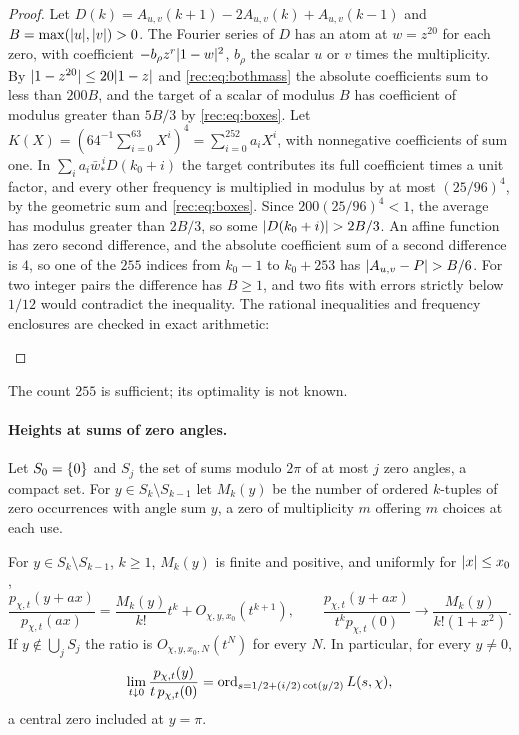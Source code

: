 \begin{proof}
Let $D(k)=A_{u,v}(k+1)-2A_{u,v}(k)+A_{u,v}(k-1)$ and $B=\max(\lvert u\rvert,\lvert v\rvert)>0$. The Fourier series of $D$ has an atom at
$w=z^{20}$ for each zero, with coefficient $-b_\rho z^r\lvert1-w\rvert^2$, $b_\rho$ the scalar $u$ or $v$ times the multiplicity. By
$\lvert1-z^{20}\rvert\le20\lvert1-z\rvert$ and \eqref{rec:eq:bothmass} the absolute coefficients sum to less than $200B$, and the target
of a scalar of modulus $B$ has coefficient of modulus greater than $5B/3$ by \eqref{rec:eq:boxes}. Let
$K(X)=(64^{-1}\sum_{i=0}^{63}X^i)^4=\sum_{i=0}^{252}a_iX^i$, with nonnegative coefficients of sum one. In
$\sum_ia_i\bar w_*^{\,i}D(k_0+i)$ the target contributes its full coefficient times a unit factor, and every other frequency is
multiplied in modulus by at most $(25/96)^4$, by the geometric sum and \eqref{rec:eq:boxes}. Since $200(25/96)^4<1$, the
average has modulus greater than $2B/3$, so some $\lvert D(k_0+i)\rvert>2B/3$. An affine function has zero second difference,
and the absolute coefficient sum of a second difference is $4$, so one of the $255$ indices from $k_0-1$ to $k_0+253$ has
$\lvert A_{u,v}-P\rvert>B/6$. For two integer pairs the difference has $B\ge1$, and two fits with errors strictly below $1/12$
would contradict the inequality. The rational inequalities and frequency enclosures are checked in exact
arithmetic:
\begin{center}
\end{center}
\end{proof}

The count $255$ is sufficient; its optimality is not known.

\paragraph{Heights at sums of zero angles.}
Let $S_0=\{0\}$ and $S_j$ the set of sums modulo $2\pi$ of at most $j$ zero angles, a compact set. For
$y\in S_k\setminus S_{k-1}$ let $M_k(y)$ be the number of ordered $k$-tuples of zero occurrences with angle sum $y$,
a zero of multiplicity $m$ offering $m$ choices at each use.

\begin{theorem}\label{rec:thm:liecho}
For $y\in S_k\setminus S_{k-1}$, $k\ge1$, $M_k(y)$ is finite and positive, and uniformly for $\lvert x\rvert\le x_0$,
\[
 \frac{p_{\chi,t}(y+ax)}{p_{\chi,t}(ax)}=\frac{M_k(y)}{k!}t^k+O_{\chi,y,x_0}(t^{k+1}),\qquad
 \frac{p_{\chi,t}(y+ax)}{t^kp_{\chi,t}(0)}\to\frac{M_k(y)}{k!(1+x^2)}.
\]
If $y\notin\bigcup_jS_j$ the ratio is $O_{\chi,y,x_0,N}(t^N)$ for every $N$. In particular, for every $y\ne0$,
\[
 \lim_{t\downarrow0}\frac{p_{\chi,t}(y)}{t\,p_{\chi,t}(0)}=\operatorname{ord}_{s=1/2+(i/2)\cot(y/2)}L(s,\chi),
\]
a central zero included at $y=\pi$.
\end{theorem}

